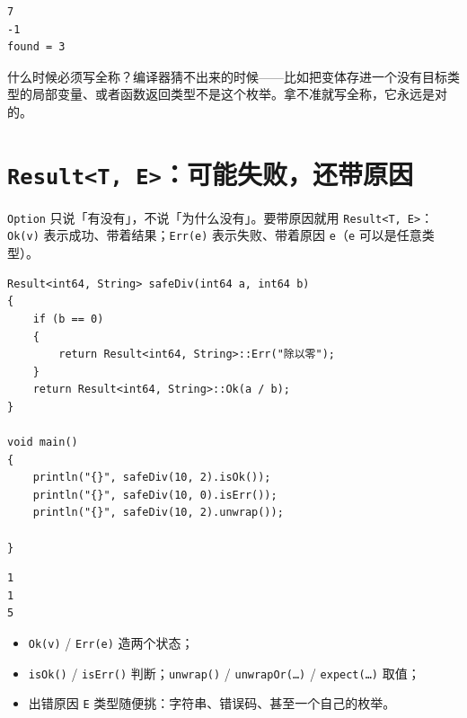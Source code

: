 \par
\medskip
\begin{lstlisting}[style=out]
7
-1
found = 3
\end{lstlisting}
\par
\medskip

什么时候必须写全称？编译器猜不出来的时候——比如把变体存进一个没有目标类型的局部变量、或者函数返回类型不是这个枚举。拿不准就写全称，它永远是对的。

\section{\texttt{Result<\allowbreak{}T,\allowbreak{} E>\allowbreak{}}：可能失败，还带原因}

\texttt{Option} 只说「有没有」，不说「为什么没有」。要带原因就用 \texttt{Result<\allowbreak{}T,\allowbreak{} E>\allowbreak{}}：\texttt{Ok(\allowbreak{}v)\allowbreak{}} 表示成功、带着结果；\texttt{Err(\allowbreak{}e)\allowbreak{}} 表示失败、带着原因 \texttt{e}（\texttt{e} 可以是任意类型）。

\par
\medskip
\begin{lstlisting}[style=chali]
Result<int64, String> safeDiv(int64 a, int64 b)
{
    if (b == 0)
    {
        return Result<int64, String>::Err("除以零");
    }
    return Result<int64, String>::Ok(a / b);
}

void main()
{
    println("{}", safeDiv(10, 2).isOk());
    println("{}", safeDiv(10, 0).isErr());
    println("{}", safeDiv(10, 2).unwrap());

}
\end{lstlisting}
\par
\medskip

\par
\medskip
\begin{lstlisting}[style=out]
1
1
5
\end{lstlisting}
\par
\medskip

\begin{itemize}

\item \texttt{Ok(\allowbreak{}v)\allowbreak{}} / \texttt{Err(\allowbreak{}e)\allowbreak{}} 造两个状态；

\item \texttt{is\allowbreak{}Ok(\allowbreak{})\allowbreak{}} / \texttt{is\allowbreak{}Err(\allowbreak{})\allowbreak{}} 判断；\texttt{unwrap(\allowbreak{})\allowbreak{}} / \texttt{unwrap\allowbreak{}Or(\allowbreak{}…)\allowbreak{}} / \texttt{expect(\allowbreak{}…)\allowbreak{}} 取值；

\item 出错原因 \texttt{E} 类型随便挑：字符串、错误码、甚至一个自己的枚举。

\end{itemize}

